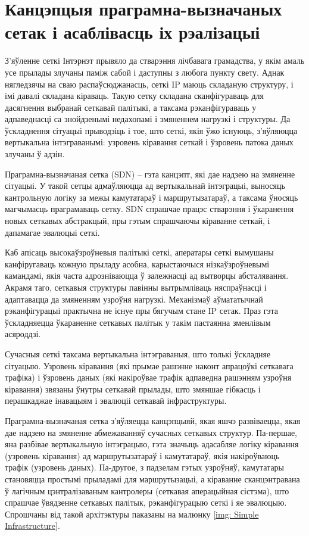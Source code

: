 \section{Канцэпцыя праграмна-вызначаных сетак і асаблівасць іх рэалізацыі}

З'яўленне сеткі Інтэрнэт прывяло да стварэння лічбавага грамадства, у якім
амаль усе прылады злучаны паміж сабой і даступны з любога пункту свету.
Аднак нягледзячы на сваю распаўсюджанасць, сеткі IP маюць складаную структуру, і імі
давалі складана кіраваць. Такую сетку складана сканфігураваць для дасягнення выбранай
сеткавай палітыкі, а таксама рэканфігураваць у адпаведнасці са знойдзенымі недахопамі і
змяненнем нагрузкі і структуры. Да ўскладнення сітуацыі прыводзіць і тое, што сеткі,
якія ўжо існуюць, з'яўляюцца вертыкальна інтэграванымі: узровень кіравання сеткай і
ўзровень патока даных злучаны ў адзін.

Праграмна-вызначаная сетка (SDN) -- гэта канцэпт, які дае надзею на змяненне сітуацыі.
У такой сетцы адмаўляюцца ад вертыкальнай інтэграцыі, выносяць кантрольную логіку
за межы камутатараў і маршрутызатараў, а таксама ўносяць магчымасць праграмаваць сетку.
SDN спрашчае працэс стварэння і ўкаранення новых сеткавых абстракцый, пры гэтым
спрашчаючы кіраванне сеткай, і дапамагае эвалюцыі сеткі.

Каб апісаць высокаўзроўневыя палітыкі сеткі, аператары сеткі вымушаны канфіругаваць кожную
прыладу асобна, карыстаючыся нізкаўзроўневымі камандамі, якія часта адрозніваюцца ў
залежнасці ад вытворцы абсталявання. Акрамя таго, сеткавыя структуры павінны
вытрымліваць няспраўнасці і адаптавацца да змяненням узроўня нагрузкі.
Механізмаў аўмататычнай рэканфігурацыі практычна не існуе пры бягучым стане IP сетак.
Праз гэта ўскладняецца ўкараненне сеткавых палітык у такім пастаянна зменлівым асяроддзі.

Сучасныя сеткі таксама вертыкальна інтэграваныя, што толькі ўскладняе сітуацыю.
Узровень кіравання (які прымае рашэнне наконт апрацоўкі сеткавага трафіка) і
ўзровень даных (які накіроўвае трафік адпаведна рашэнням узроўня кіравання) звязаны
ўнутры сеткавай прылады, што змяншае гібкасць і перашкаджае інавацыям і эвалюціі
сеткавай інфраструктуры.

Праграмна-вызначаная сетка з'яўляецца канцэпцыяй, якая яшчэ развіваецца, якая дае надзею
на змяненне абмежаванняў сучасных сеткавых структур.
Па-першае, яна разбівае вертыкальную інтэграцыю, гэта значыць адасабляе логіку кіравання
(узровень кіравання) ад маршрутызатараў і камутатараў, якія накіроўваюць трафік (узровень даных).
Па-другое, з падзелам гэтых узроўняў, камутатары становяцца простымі прыладамі для маршрутызацыі,
а кіраванне сканцэнтравана ў лагічным цэнтралізаваным кантролеры (сеткавая аперацыйная сістэма),
што спрашчае ўвядзенне сеткавых палітык, рэканфігурацыю сеткі і яе эвалюцыю.
Спрошчаны від такой архітэктуры паказаны на малюнку \ref{img: Simple Infrastructure}.

